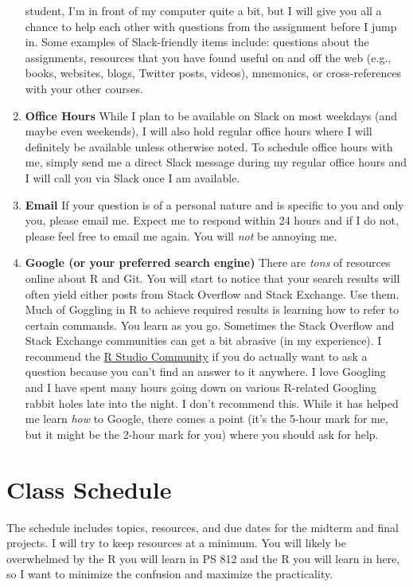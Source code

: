 \documentclass[11pt,]{article}
\begin{document}
\begin{enumerate}
  student, I'm in front of my computer quite a bit, but I will give you
  all a chance to help each other with questions from the assignment
  before I jump in. Some examples of Slack-friendly items include:
  questions about the assignments, resources that you have found useful
  on and off the web (e.g., books, websites, blogs, Twitter posts,
  videos), mnemonics, or cross-references with your other courses.
\item
  \textbf{Office Hours} While I plan to be available on Slack on most
  weekdays (and maybe even weekends), I will also hold regular office
  hours where I will definitely be available unless otherwise noted. To
  schedule office hours with me, simply send me a direct Slack message
  during my regular office hours and I will call you via Slack once I am
  available.
\item
  \textbf{Email} If your question is of a personal nature and is
  specific to you and only you, please email me. Expect me to respond
  within 24 hours and if I do not, please feel free to email me again.
  You will \emph{not} be annoying me.
\item
  \textbf{Google (or your preferred search engine)} There are
  \emph{tons} of resources online about R and Git. You will start to
  notice that your search results will often yield either posts from
  Stack Overflow and Stack Exchange. Use them. Much of Goggling in R to
  achieve required results is learning how to refer to certain commands.
  You learn as you go. Sometimes the Stack Overflow and Stack Exchange
  communities can get a bit abrasive (in my experience). I recommend the
  \href{https://community.rstudio.com/}{R Studio Community} if you do
  actually want to ask a question because you can't find an answer to it
  anywhere. I love Googling and I have spent many hours going down on
  various R-related Googling rabbit holes late into the night. I don't
  recommend this. While it has helped me learn \emph{how} to Google,
  there comes a point (it's the 5-hour mark for me, but it might be the
  2-hour mark for you) where you should ask for help.
\end{enumerate}

\hypertarget{class-schedule}{%
\section{Class Schedule}\label{class-schedule}}

The schedule includes topics, resources, and due dates for the midterm
and final projects. I will try to keep resources at a minimum. You will
likely be overwhelmed by the R you will learn in PS 812 and the R you
will learn in here, so I want to minimize the confusion and maximize the
practicality.
\end{document}
